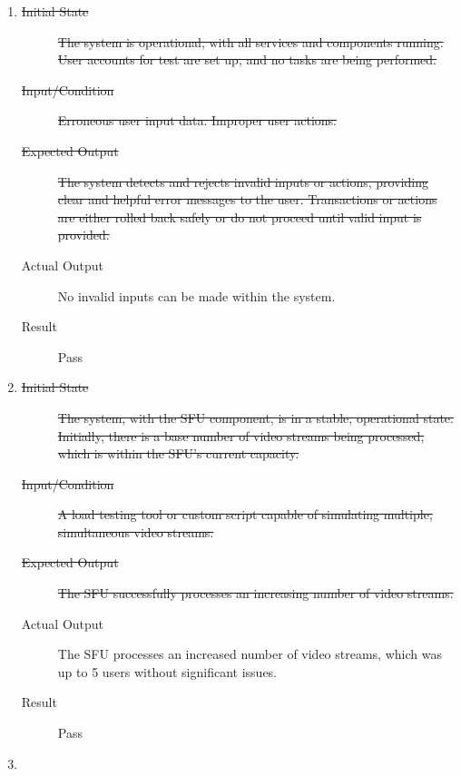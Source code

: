 \documentclass[12pt, titlepage]{article}
\begin{document}
\begin{enumerate}[NFR-T1]
  \item \label{NFRT4}
    \begin{description}
    \item[\sout{Initial State}]\sout{ The system is operational, with all services and
      components running. User accounts for test are set up, and no tasks are
      being performed.
    }\item[\sout{Input/Condition}]\sout{ Erroneous user input data. Improper user actions.
    }\item[\sout{Expected Output}]\sout{ The system detects and rejects invalid inputs or
      actions, providing clear and helpful error messages to the user.
      Transactions or actions are either rolled back safely or do not proceed
      until valid input is provided.
    }\item[Actual Output] No invalid inputs can be made within the system.
    \item[Result] Pass
    \end{description}
  \item \label{NFRT6}
    \begin{description}
    \item[\sout{Initial State}]\sout{ The system, with the SFU component, is in a stable,
      operational state. Initially, there is a base number of video streams
      being processed, which is within the SFU's current capacity.
    }\item[\sout{Input/Condition}]\sout{ A load testing tool or custom script capable of
      simulating multiple, simultaneous video streams.
    }\item[\sout{Expected Output}]\sout{ The SFU successfully processes an increasing number of
      video streams.
    }\item[Actual Output] The SFU processes an increased number of video streams,
      which was up to 5 users without significant issues.
    \item[Result] Pass
    \end{description}
  \item \label{NFRT7}
    \begin{description}

\end{description}
\end{enumerate}
\end{document}
